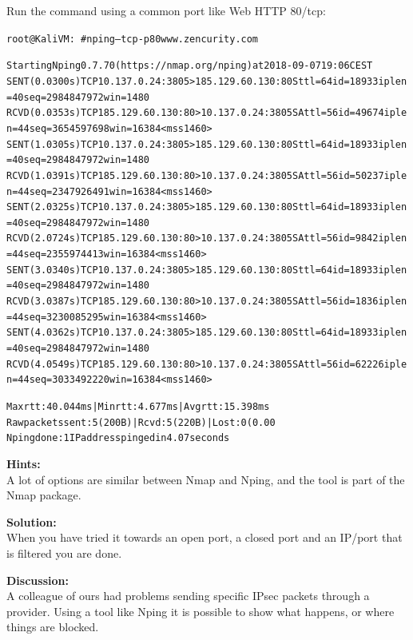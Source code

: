 \documentclass[a4paper,11pt,notitlepage]{report}
\begin{document}
Run the command using a common port like Web HTTP 80/tcp:
\begin{alltt}\scriptsize
root@KaliVM:~# nping --tcp -p 80 www.zencurity.com

Starting Nping 0.7.70 ( https://nmap.org/nping ) at 2018-09-07 19:06 CEST
SENT (0.0300s) TCP 10.137.0.24:3805 > 185.129.60.130:80 S ttl=64 id=18933 iplen=40  seq=2984847972 win=1480
RCVD (0.0353s) TCP 185.129.60.130:80 > 10.137.0.24:3805 SA ttl=56 id=49674 iplen=44  seq=3654597698 win=16384 <mss 1460>
SENT (1.0305s) TCP 10.137.0.24:3805 > 185.129.60.130:80 S ttl=64 id=18933 iplen=40  seq=2984847972 win=1480
RCVD (1.0391s) TCP 185.129.60.130:80 > 10.137.0.24:3805 SA ttl=56 id=50237 iplen=44  seq=2347926491 win=16384 <mss 1460>
SENT (2.0325s) TCP 10.137.0.24:3805 > 185.129.60.130:80 S ttl=64 id=18933 iplen=40  seq=2984847972 win=1480
RCVD (2.0724s) TCP 185.129.60.130:80 > 10.137.0.24:3805 SA ttl=56 id=9842 iplen=44  seq=2355974413 win=16384 <mss 1460>
SENT (3.0340s) TCP 10.137.0.24:3805 > 185.129.60.130:80 S ttl=64 id=18933 iplen=40  seq=2984847972 win=1480
RCVD (3.0387s) TCP 185.129.60.130:80 > 10.137.0.24:3805 SA ttl=56 id=1836 iplen=44  seq=3230085295 win=16384 <mss 1460>
SENT (4.0362s) TCP 10.137.0.24:3805 > 185.129.60.130:80 S ttl=64 id=18933 iplen=40  seq=2984847972 win=1480
RCVD (4.0549s) TCP 185.129.60.130:80 > 10.137.0.24:3805 SA ttl=56 id=62226 iplen=44  seq=3033492220 win=16384 <mss 1460>

Max rtt: 40.044ms | Min rtt: 4.677ms | Avg rtt: 15.398ms
Raw packets sent: 5 (200B) | Rcvd: 5 (220B) | Lost: 0 (0.00%
Nping done: 1 IP address pinged in 4.07 seconds
\end{alltt}

{\bf Hints:} \\
A lot of options are similar between Nmap and Nping, and the tool is part of the Nmap package.

{\bf Solution:}\\
When you have tried it towards an open port, a closed port and an IP/port that is filtered you are done.

{\bf Discussion:}\\
A colleague of ours had problems sending specific IPsec packets through a provider. Using a tool like Nping it is possible to show what happens, or where things are blocked.
\end{document}
